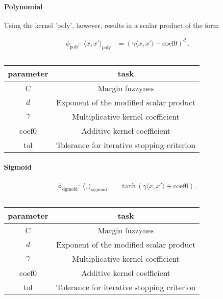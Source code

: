 \paragraph{Polynomial}
Using the kernel 'poly', however, results in a scalar product of the form
%
\begin{ceqn}
  \begin{align}
     \phi_\text{poly}:~\langle x,x'\rangle_\text{poly} &= \left( \gamma \langle x,x'\rangle + \text{coef0}  \right)^d\,.
  \end{align}
\end{ceqn}
%
%
\begin{table}[h!]
  \centering
  \begin{tabular}{c|c}
    parameter & task \\
    \hline\hline
    C         & Margin fuzzynes \\
    $d$       & Exponent of the modified scalar product\\
    $\gamma$  & Multiplicative kernel coefficient \\
    coef0     & Additive kernel coefficient \\
    tol       & Tolerance for iterative stopping criterion \\
    \hline
  \end{tabular}
  \caption{}
  \label{tab:poly_parametrs}
\end{table}
%

\paragraph{Sigmoid}
%
\begin{ceqn}
  \begin{align}
     \phi_\text{sigmoid}:~\langle,\rangle_\text{sigmoid} &= \text{tanh}\, \left( \gamma \langle x,x'\rangle + \text{coef0}  \right)\,.
  \end{align}
\end{ceqn}
%
%
\begin{table}[h!]
  \centering
  \begin{tabular}{c|c}
    parameter & task \\
    \hline\hline
    C         & Margin fuzzynes \\
    $d$       & Exponent of the modified scalar product\\
    $\gamma$  & Multiplicative kernel coefficient \\
    coef0     & Additive kernel coefficient \\
    tol       & Tolerance for iterative stopping criterion \\
    \hline
  \end{tabular}
  \caption{}
  \label{tab:poly_parametrs}
\end{table}
%


